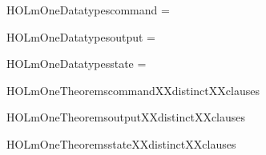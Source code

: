 \newcommand{\HOLmOneDate}{16 November 2017}
\newcommand{\HOLmOneTime}{12:15}
\begin{SaveVerbatim}{HOLmOneDatatypescommand}
 =  \HOLTokenBar{} 
\end{SaveVerbatim}
\newcommand{\HOLmOneDatatypescommand}{\UseVerbatim{HOLmOneDatatypescommand}}
\begin{SaveVerbatim}{HOLmOneDatatypesoutput}
 =  \HOLTokenBar{} 
\end{SaveVerbatim}
\newcommand{\HOLmOneDatatypesoutput}{\UseVerbatim{HOLmOneDatatypesoutput}}
\begin{SaveVerbatim}{HOLmOneDatatypesstate}
 =  \HOLTokenBar{}  \HOLTokenBar{} 
\end{SaveVerbatim}
\newcommand{\HOLmOneDatatypesstate}{\UseVerbatim{HOLmOneDatatypesstate}}
\newcommand{\HOLmOneDatatypes}{
\HOLmOneDatatypescommand\HOLmOneDatatypesoutput\HOLmOneDatatypesstate}
\begin{SaveVerbatim}{HOLmOneTheoremscommandXXdistinctXXclauses}
\HOLTokenTurnstile{}  \HOLSymConst{\HOLTokenNotEqual{}} 
\end{SaveVerbatim}
\newcommand{\HOLmOneTheoremscommandXXdistinctXXclauses}{\UseVerbatim{HOLmOneTheoremscommandXXdistinctXXclauses}}
\begin{SaveVerbatim}{HOLmOneTheoremsoutputXXdistinctXXclauses}
\HOLTokenTurnstile{}  \HOLSymConst{\HOLTokenNotEqual{}} 
\end{SaveVerbatim}
\newcommand{\HOLmOneTheoremsoutputXXdistinctXXclauses}{\UseVerbatim{HOLmOneTheoremsoutputXXdistinctXXclauses}}
\begin{SaveVerbatim}{HOLmOneTheoremsstateXXdistinctXXclauses}
\HOLTokenTurnstile{}  \HOLSymConst{\HOLTokenNotEqual{}}  \HOLSymConst{\HOLTokenConj{}}  \HOLSymConst{\HOLTokenNotEqual{}}  \HOLSymConst{\HOLTokenConj{}}  \HOLSymConst{\HOLTokenNotEqual{}} 
\end{SaveVerbatim}
\newcommand{\HOLmOneTheoremsstateXXdistinctXXclauses}{\UseVerbatim{HOLmOneTheoremsstateXXdistinctXXclauses}}
\newcommand{\HOLmOneTheorems}{
\HOLThmTag{m1}{command_distinct_clauses}\HOLmOneTheoremscommandXXdistinctXXclauses
\HOLThmTag{m1}{output_distinct_clauses}\HOLmOneTheoremsoutputXXdistinctXXclauses
\HOLThmTag{m1}{state_distinct_clauses}\HOLmOneTheoremsstateXXdistinctXXclauses
}
